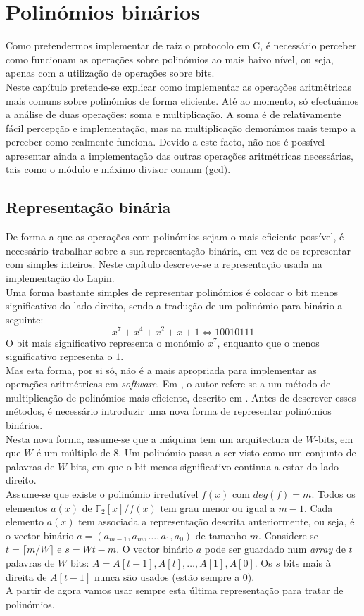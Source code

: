 \section{Polinómios binários}
Como pretendermos implementar de raíz o protocolo em \textsf{C}, é necessário perceber como funcionam as operações sobre polinómios ao mais baixo nível, ou seja, apenas com a utilização de operações sobre bits.\\
Neste capítulo pretende-se explicar como implementar as operações aritmétricas mais comuns sobre polinómios de forma eficiente. Até ao momento, só efectuámos a análise de duas operações: soma e multiplicação. A soma é de relativamente fácil percepção e implementação, mas na multiplicação demorámos mais tempo a perceber como realmente funciona. Devido a este facto, não nos é possível apresentar ainda a implementação das outras operações aritmétricas necessárias, tais como o módulo e máximo divisor comum (\textsf{gcd}).\\
\subsection{Representação binária}
De forma a que as operações com polinómios sejam o mais eficiente possível, é necessário trabalhar sobre a sua representação binária, em vez de os representar com simples inteiros. Neste capítulo descreve-se a representação usada na implementação do Lapin.\\
Uma forma bastante simples de representar polinómios é colocar o bit menos significativo do lado direito, sendo a tradução de um polinómio para binário a seguinte:
$$
x^7 + x^4 + x^2 + x + 1 \Leftrightarrow 1 0 0 1 0 1 1 1
$$
O bit mais significativo representa o monómio $x^7$, enquanto que o menos significativo representa o $1$.\\
Mas esta forma, por si só, não é a mais apropriada para implementar as operações aritmétricas em \textit{software}. Em \cite{lapin}, o autor refere-se a um método de multiplicação de polinómios mais eficiente, descrito em \cite{Hankerson:2003:GEC:940321}. Antes de descrever esses métodos, é necessário introduzir uma nova forma de representar polinómios binários.\\
Nesta nova forma, assume-se que a máquina tem um arquitectura de $W$-bits, em que $W$ é um múltiplo de 8. Um polinómio passa a ser visto como um conjunto de palavras de $W$ bits, em que o bit menos significativo continua a estar do lado direito.\\
Assume-se que existe o polinómio irredutível $f(x)$ com $deg(f) = m$. Todos os elementos $a(x)$ de $\mathbb{F}_2[x]/f(x)$ tem grau menor ou igual a $m-1$. Cada elemento $a(x)$ tem associada a representação descrita anteriormente, ou seja, é o vector binário $a = (a_{m-1}, a_m, \dotsc, a_1, a_0)$ de tamanho $m$. Considere-se $t = \lceil m/W \rceil$ e $s = Wt - m$. O vector binário $a$ pode ser guardado num \textit{array} de $t$ palavras de $W$ bits: $A = A[t-1], A[t], \dotsc, A[1], A[0]$. Os $s$ bits mais à direita de $A[t-1]$ nunca são usados (estão sempre a 0).\\
A partir de agora vamos usar sempre esta última representação para tratar de polinómios.\\
